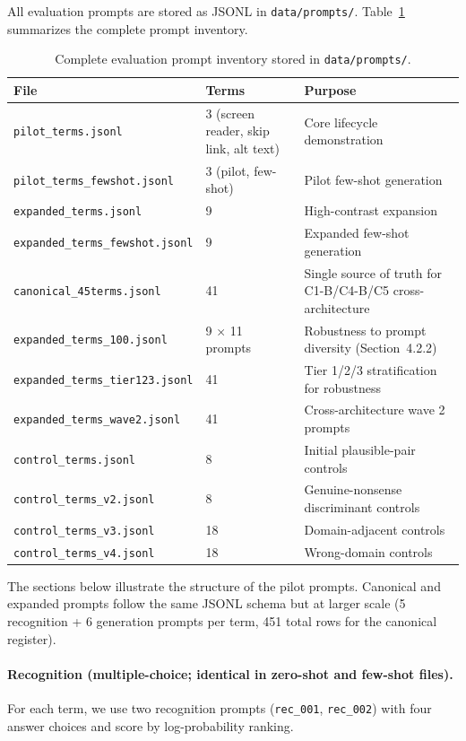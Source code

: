 \documentclass[10pt]{article} %
\begin{document}
All evaluation prompts are stored as JSONL in \texttt{data/prompts/}. Table~\ref{tab:prompt_files} summarizes the complete prompt inventory.

\begin{table}[ht]
\centering
\small
\begin{tabular}{|l|l|l|}
\hline
\textbf{File} & \textbf{Terms} & \textbf{Purpose} \\
\hline
\texttt{pilot\_terms.jsonl} & 3 (screen reader, skip link, alt text) & Core lifecycle demonstration \\
\texttt{pilot\_terms\_fewshot.jsonl} & 3 (pilot, few-shot) & Pilot few-shot generation \\
\texttt{expanded\_terms.jsonl} & 9 & High-contrast expansion \\
\texttt{expanded\_terms\_fewshot.jsonl} & 9 & Expanded few-shot generation \\
\texttt{canonical\_45terms.jsonl} & 41 & Single source of truth for C1-B/C4-B/C5 cross-architecture \\
\texttt{expanded\_terms\_100.jsonl} & 9 $\times$ 11 prompts & Robustness to prompt diversity (Section~4.2.2) \\
\texttt{expanded\_terms\_tier123.jsonl} & 41 & Tier 1/2/3 stratification for robustness \\
\texttt{expanded\_terms\_wave2.jsonl} & 41 & Cross-architecture wave 2 prompts \\
\texttt{control\_terms.jsonl} & 8 & Initial plausible-pair controls \\
\texttt{control\_terms\_v2.jsonl} & 8 & Genuine-nonsense discriminant controls \\
\texttt{control\_terms\_v3.jsonl} & 18 & Domain-adjacent controls \\
\texttt{control\_terms\_v4.jsonl} & 18 & Wrong-domain controls \\
\hline
\end{tabular}
\caption{Complete evaluation prompt inventory stored in \texttt{data/prompts/}.}
\label{tab:prompt_files}
\end{table}

\medskip

The sections below illustrate the structure of the pilot prompts. Canonical and expanded prompts follow the same JSONL schema but at larger scale (5 recognition + 6 generation prompts per term, 451 total rows for the canonical register).

\paragraph{Recognition (multiple-choice; identical in zero-shot and few-shot files).}
For each term, we use two recognition prompts (\texttt{rec\_001}, \texttt{rec\_002}) with four answer choices and score by log-probability ranking.
\end{document}
